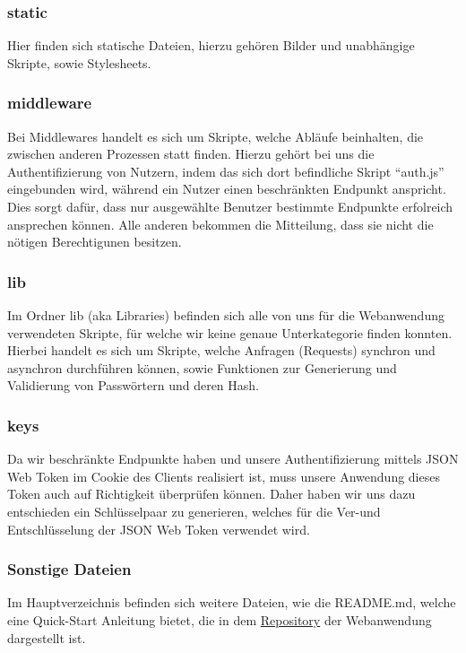\subsubsection*{static}
Hier finden sich statische Dateien, hierzu gehören Bilder und unabhängige Skripte, sowie Stylesheets.

\subsubsection*{middleware}
Bei Middlewares handelt es sich um Skripte, welche Abläufe beinhalten, die zwischen anderen Prozessen statt finden.
Hierzu gehört bei uns die Authentifizierung von Nutzern, indem das sich dort befindliche Skript ``auth.js'' eingebunden wird,
während ein Nutzer einen beschränkten Endpunkt anspricht. Dies sorgt dafür, dass nur ausgewählte Benutzer bestimmte Endpunkte
erfolreich ansprechen können. Alle anderen bekommen die Mitteilung, dass sie nicht die nötigen Berechtigunen besitzen.

\subsubsection*{lib}
Im Ordner lib (aka Libraries) befinden sich alle von uns für die Webanwendung verwendeten Skripte, für welche wir keine genaue
Unterkategorie finden konnten. Hierbei handelt es sich um Skripte, welche Anfragen (Requests) synchron und asynchron durchführen können,
sowie Funktionen zur Generierung und Validierung von Passwörtern und deren Hash.

\subsubsection*{keys}
Da wir beschränkte Endpunkte haben und unsere Authentifizierung mittels JSON Web Token im Cookie des Clients realisiert ist,
muss unsere Anwendung dieses Token auch auf Richtigkeit überprüfen können. Daher haben wir uns dazu entschieden ein Schlüsselpaar
zu generieren, welches für die Ver-und Entschlüsselung der JSON Web Token verwendet wird.

\subsubsection*{Sonstige Dateien}
Im Hauptverzeichnis befinden sich weitere Dateien, wie die README.md, welche eine Quick-Start Anleitung bietet, die in
dem \href{https://github.com/ProjectPepperHSB/NodeJS_Server4Pepper}{Repository} der Webanwendung dargestellt ist.

